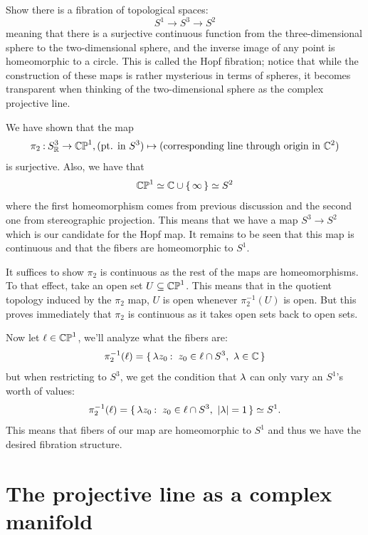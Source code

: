 \documentclass[12pt]{memoir}
\begin{document}
\begin{Ej}
    Show there is a fibration of topological spaces:
    $$S^1\to S^3\to S^2$$
    meaning that there is a surjective continuous function from the three-dimensional sphere to the two-dimensional sphere, and the inverse image of any point is homeomorphic to a circle. This is called the Hopf fibration; notice that while the construction of these maps is rather mysterious in terms of spheres, it becomes transparent when thinking of the two-dimensional sphere as the complex projective line.
\end{Ej}
\begin{ptcbr}
We have shown that the map 
$$\pi_2\mathbin{:} S^3_{\mathbb{R}}\to\mathbb{CP}^1,(\text{pt. in }S^3)\mapsto(\text{corresponding line through origin in }\mathbb{C}^2)$$
is surjective. Also, we have that 
$$\mathbb{CP}^1\simeq \mathbb{C}\cup\{\,\infty\,\}\simeq S^2$$
where the first homeomorphism comes from previous discussion and the second one from stereographic projection. This means that we have a map $S^3\to S^2$ which is our candidate for the Hopf map. It remains to be seen that this map is continuous and that the fibers are homeomorphic to $S^1$.\par 
It suffices to show $\pi_2$ is continuous as the rest of the maps are homeomorphisms. To that effect, take an open set $U\subseteq\mathbb{CP}^1$. This means that in the quotient topology induced by the $\pi_2$ map, $U$ is open whenever $\pi_2^{-1}(U)$ is open. But this proves immediately that $\pi_2$ is continuous as it takes open sets back to open sets.\par 
Now let $\ell\in\mathbb{CP}^1$, we'll analyze what the fibers are:
$$\pi_2^{-1}(\l)=\set{\la z_0\:\ z_0\in\l\cap S^3,\ \la\in\bC}$$
but when restricting to $S^3$, we get the condition that $\lambda$ can only vary an $S^1$'s worth of values:
$$\pi_2^{-1}(\ell)=\{\,\lambda z_0\mathbin{:}\ z_0\in\ell\cap S^3,\ |\lambda|=1\,\}\simeq S^1.$$
This means that fibers of our map are homeomorphic to $S^1$ and thus we have the desired fibration structure.
\end{ptcbr}
\newpage
\section{The projective line as a complex manifold}
\end{document}
